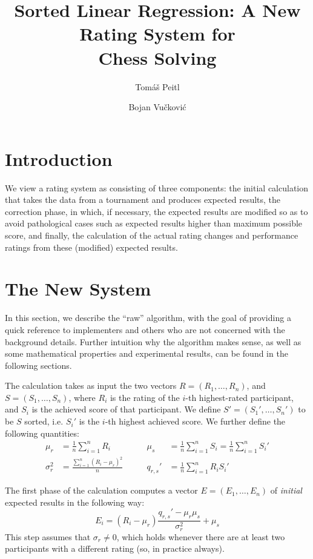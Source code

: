 \documentclass{article}
\title{Sorted Linear Regression: A New Rating System for\\ Chess Solving}
\author{Tom\'{a}\v{s} Peitl \and Bojan Vučković}
\newcommand{\artg}{\mu_r}
\newcommand{\ascr}{\mu_s}
\newcommand{\vrtg}{\sigma_r}
\newcommand{\cov}{q_{r,s}}
\begin{document}
\maketitle
{}

\section{Introduction}
We view a rating system as consisting of three components: the initial calculation that takes the data from a tournament and produces expected results, the correction phase, in which, if necessary, the expected results are modified so as to avoid pathological cases such as expected results higher than maximum possible score, and finally, the calculation of the actual rating changes and performance ratings from these (modified) expected results.

\section{The New System}
In this section, we describe the ``raw'' algorithm, with the goal of providing a quick reference to implementers and others who are not concerned with the background details.
Further intuition why the algorithm makes sense, as well as some mathematical properties and experimental results, can be found in the following sections.

The calculation takes as input the two vectors $R=(R_1,\ldots,R_n)$, and $S=(S_1,\ldots,S_n)$, where $R_i$ is the rating of the $i$-th highest-rated participant, and $S_i$ is the achieved score of that participant.
We define $S'=(S_1',\ldots,S_n')$ to be $S$ sorted, i.e. $S_i'$ is the $i$-th highest achieved score.
We further define the following quantities:
\begin{align*}
\artg&=\frac{1}{n}\sum_{i=1}^n R_i\qquad & \ascr&=\frac{1}{n}\sum_{i=1}^n S_i=\frac{1}{n}\sum_{i=1}^n S_i'\\
\vrtg^2&=\frac{\sum_{i=1}^n (R_i-\artg)^2}{n}\qquad & \cov'&=\frac{1}{n}\sum_{i=1}^n R_iS_i'
\end{align*}

The first phase of the calculation computes a vector $E=(E_1,\ldots,E_n)$ of \emph{initial} expected results in the following way:
\begin{equation}\label{init_expected_res}
E_i= (R_i - \artg) \frac{\cov'-\artg\ascr}{\vrtg^2} + \ascr
\end{equation}
This step assumes that $\vrtg\neq 0$, which holds whenever there are at least two participants with a different rating (so, in practice always).
\end{document}
